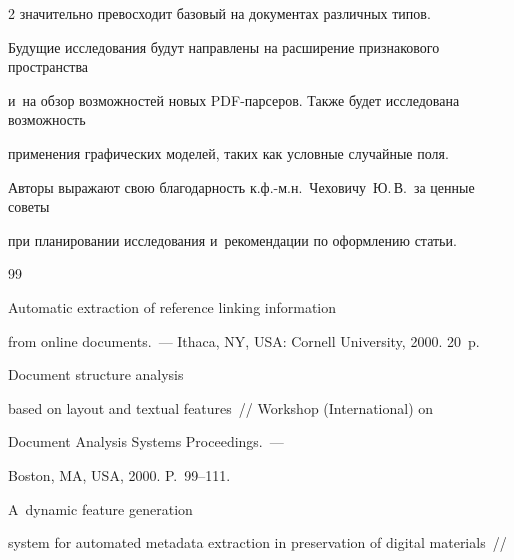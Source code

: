 \begin{multicols}{2}
значительно превосходит базовый на документах различных типов.





Будущие исследования будут направлены на расширение признакового пространства 


и~на обзор возможностей новых PDF-пар\-се\-ров. Также будет исследована воз\-мож\-ность 


применения графических моделей, таких как услов\-ные случайные поля.





\bigskip





Авторы выражают свою благодарность к.ф.-м.н.\ Чеховичу~Ю.\,В.\ за ценные советы 


при планировании исследования и~рекомендации по оформлению статьи.








{\small\frenchspacing


 {%




 \begin{thebibliography}{99}




   Automatic extraction of reference linking information 


from online documents.~--- Ithaca, NY, USA: Cornell University, 2000. 20~p.







 Document structure analysis 


based on layout and textual features~//  Workshop (International) on 


Document Analysis Systems Proceedings.~---


        Boston, MA, USA, 2000. P.~99--111.







     A~dynamic feature generation 


system for automated metadata extraction in preservation of digital materials~// 



\end{thebibliography}}}
\end{multicols}
